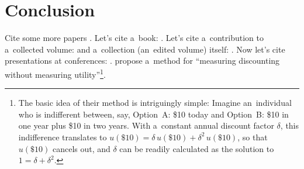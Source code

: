 


\blindmathfalse


\section{Conclusion}
\label{sec:Conclusion}

Cite some more papers \citep{Yaari1965, Warner2001, Davidoff2005, Benartzi2011}. Let's cite a~book: \cite{Luce1959}. Let's cite a~contribution to a~collected volume: \cite{Harrison2008} and a~collection (an~edited volume) itself: \cite{Kagel2016}. Now let's cite presentations at conferences: \cite{Beute2012, Vosgerau2008}. \cite{Attema2016} propose a~method for ``measuring discounting without measuring utility''\footnote{The basic idea of their method is intriguingly simple: Imagine an~individual who is indifferent between, say, Option~A: \$10 today and Option~B: \$10 in one year plus \$10 in two years. With a~constant annual discount factor $\delta$, this indifference translates to $u(\$10) = \delta\,u(\$10) + \delta^2\,u(\$10)$, so that $u(\$10)$ cancels out, and $\delta$ can be readily calculated as the solution to $1 = {\delta + \delta^2}$.}.

\blindtext
